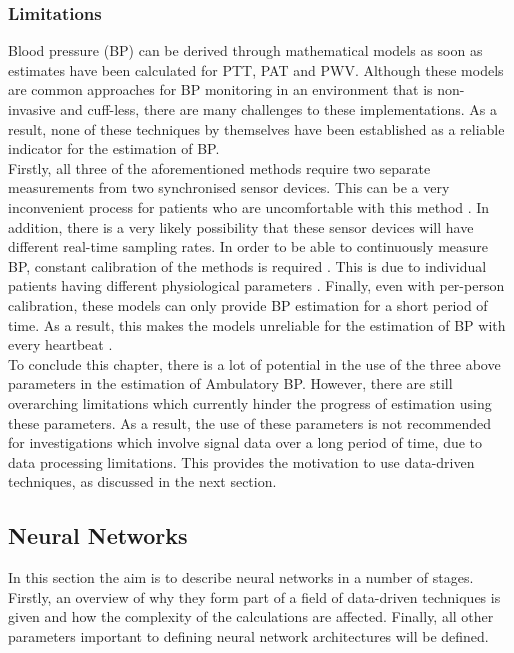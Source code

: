 \subsubsection{Limitations}
Blood pressure (BP) can be derived through mathematical models as 
soon as estimates have been calculated for PTT, PAT and PWV. Although 
these models are common approaches for BP monitoring in an environment 
that is non-invasive and cuff-less, there are many challenges to these 
implementations. As a result, none of these techniques by themselves 
have been established as a reliable indicator for the estimation 
of BP. \\ \newline \noindent Firstly, all three of the aforementioned 
methods require two separate measurements from two synchronised sensor 
devices. This can be a very inconvenient process for patients who are
uncomfortable with this method \cite{Jeong2021}. In 
addition, there is a very likely possibility that these sensor devices 
will have different real-time sampling rates. In order to be able to 
continuously measure BP, constant calibration of the methods is 
required \cite{ElHajj2020}. This is due to individual patients having different 
physiological parameters \cite{Jeong2021}. Finally, 
even with per-person calibration, these models can only provide BP 
estimation for a short period of time. As a result, this makes the 
models unreliable for the estimation of BP with every 
heartbeat \cite{ElHajj2020}. \\ \newline \noindent To conclude this 
chapter, there is a lot of potential in the use of the three above 
parameters in the estimation of Ambulatory BP. However, there are still 
overarching limitations which currently hinder the progress of estimation using these 
parameters. As a result, the use of these parameters is not recommended for investigations which 
involve signal data over a long period of time, due to data processing limitations. This provides the motivation to use data-driven techniques, as discussed in the next 
section.




 \subsection{Neural Networks}

 In this section the aim is to describe neural networks in a number of stages. Firstly, an overview of why they form part of a field 
 of data-driven techniques is given and how the complexity of the calculations are affected. Finally, all other parameters important to defining neural network architectures will be defined.

